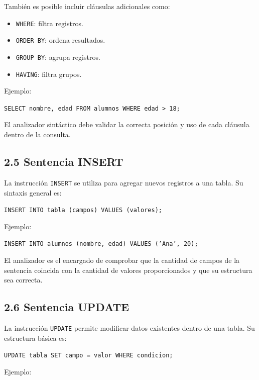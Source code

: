 \documentclass{article}
\begin{document}
También es posible incluir cláusulas adicionales como:
\begin{itemize}
\item \texttt{WHERE}: filtra registros.
\item \texttt{ORDER BY}: ordena resultados.
\item \texttt{GROUP BY}: agrupa registros.
\item \texttt{HAVING}: filtra grupos.
\end{itemize}

Ejemplo:

\begin{center}
\texttt{SELECT nombre, edad FROM alumnos WHERE edad > 18;}
\end{center}

El analizador sintáctico debe validar la correcta posición y uso de cada cláusula dentro de la consulta.

\subsection{2.5 Sentencia INSERT}

La instrucción \texttt{INSERT} se utiliza para agregar nuevos registros a una tabla. Su sintaxis general es:

\begin{center}
\texttt{INSERT INTO tabla (campos) VALUES (valores);}
\end{center}

Ejemplo:

\begin{center}
\texttt{INSERT INTO alumnos (nombre, edad) VALUES ('Ana', 20);}
\end{center}

El analizador es el encargado de comprobar que la cantidad de campos de la sentencia coincida con la cantidad de valores proporcionados y que su estructura sea correcta.

\subsection{2.6 Sentencia UPDATE}

La instrucción \texttt{UPDATE} permite modificar datos existentes dentro de una tabla. Su estructura básica es:

\begin{center}
\texttt{UPDATE tabla SET campo = valor WHERE condicion;}
\end{center}

Ejemplo:
\end{document}
